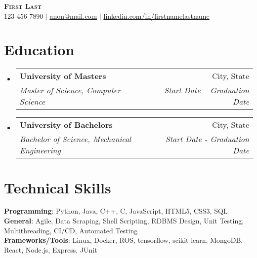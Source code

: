 \documentclass[letterpaper,11pt]{article}
\makeatletter
\newcommand{\resumeSubheading}[4]{
  \vspace{-3pt}\item
    \begin{tabular*}{0.97\textwidth}[t]{l@{\extracolsep{\fill}}r}
      \textbf{#1} & #2 \\
      \textit{\small#3} & \textit{\small #4} \\
    \end{tabular*}\vspace{-7pt}
}
\newcommand{\resumeSubHeadingListStart}
{\begin{itemize}[leftmargin=0.05in, label={}]}
\newcommand{\resumeSubHeadingListEnd}{\end{itemize}}
\makeatother
\begin{document}

\begin{center}
  \textbf{\Huge \scshape First Last} \\ \vspace{1pt}
  \small 123-456-7890 $|$ \href{mailto:anon@mail.com}{\underline{anon@mail.com}} $|$
  \href{https://linkedin.com/in/...}{\underline{linkedin.com/in/firstnamelastname}} %
\end{center}


\section{Education}
\resumeSubHeadingListStart
\resumeSubheading
{University of Masters}{City, State}
{Master of Science, Computer Science}{Start Date -- Graduation Date}

\resumeSubheading
{University of Bachelors}{City, State}
{Bachelor of Science, Mechanical Engineering}{Start Date - Graduation Date}

\resumeSubHeadingListEnd

\section{Technical Skills}
\begin{itemize}[leftmargin=0.15in, label={}]
  \small{\item{
        \textbf{Programming}{: Python, Java, C++, C, JavaScript, HTML5, CSS3, SQL} \\
        \textbf{General}{: Agile, Data Scraping, Shell Scripting, RDBMS Design, Unit Testing, Multithreading, CI/CD, Automated Testing} \\
        \textbf{Frameworks/Tools}{: Linux, Docker, ROS, tensorflow, scikit-learn, MongoDB, React, Node.js, Express, JUnit}
        }}
\end{itemize}
\end{document}
